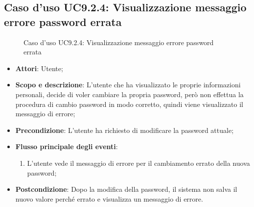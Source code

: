\documentclass[12pt,a4paper]{article}
\begin{document}
\subsection{Caso d'uso UC9.2.4: Visualizzazione messaggio errore password errata}
\begin{figure}[H]
	\centering

	\caption{Caso d'uso UC9.2.4: Visualizzazione messaggio errore password errata}\label{fig:UC9.2.4} 
\end{figure}\begin{itemize}
\item \textbf{Attori}: Utente;
\item \textbf{Scopo e descrizione}: L’utente che ha visualizzato le proprie informazioni personali, decide di voler cambiare la propria password, però non effettua la procedura di cambio password in modo corretto, quindi viene visualizzato il messaggio di errore; 
\item \textbf{Precondizione}: L’utente ha richiesto di modificare la password attuale;

\item \textbf{Flusso principale degli eventi}:
\begin{enumerate}
	\item L’utente vede il messaggio di errore per il cambiamento errato della nuova password;
	
\end{enumerate}
\item \textbf{Postcondizione}: Dopo la modifica della password, il sistema non salva il nuovo valore perché errato e visualizza un messaggio di errore.
\end{itemize}
\end{document}

